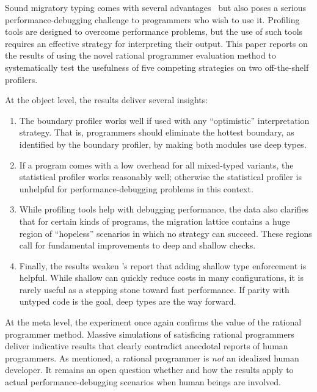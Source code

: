 

Sound migratory typing comes with several advantages~\cite{lgfd-icfp-2021} 
but also poses a serious performance-debugging challenge to
programmers who wish to use it.
Profiling tools are designed to overcome performance problems, but the
use of such tools requires an effective strategy for interpreting their output.
This paper reports
on the results of using the novel rational programmer evaluation method to
systematically test the usefulness of five competing strategies on two
off-the-shelf profilers.

At the object level, the results deliver several insights:
\begin{enumerate}
  \item
    The boundary profiler works well if used with any ``optimistic''
    interpretation strategy. That is, programmers should eliminate the hottest
    boundary, as identified by the boundary profiler, by making both modules
    use deep types.

  \item
    If a program comes with a low overhead for all mixed-typed
    variants, the statistical profiler works reasonably well; otherwise the
    statistical profiler is unhelpful for performance-debugging problems in
    this context.

  \item
    While profiling tools help with debugging
    performance, the data also clarifies that for
    certain kinds of programs, the migration lattice contains a huge region
    of ``hopeless'' scenarios in which no strategy can succeed.
    These regions call for fundamental improvements to deep and shallow checks.

  \item
    Finally, the results weaken \citet{g-deep-shallow}'s report that
    adding shallow type enforcement is helpful.
    While shallow can quickly reduce costs in many configurations, it is
    rarely useful as a stepping stone toward fast performance.
    If parity with untyped code is the goal, deep types are the way forward.
\end{enumerate}

At the meta level, the experiment once again confirms the value of the
rational programmer method. Massive simulations of satisficing rational
programmers deliver indicative results that clearly contradict anecdotal reports
of human programmers. As mentioned, a rational programmer is {\em not\/} an
idealized human developer. It remains an open question whether and how the
results apply to actual performance-debugging scenarios when human beings are
involved.

